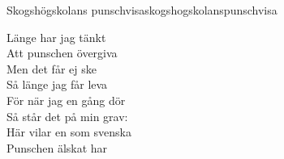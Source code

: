 \begin{song}{Skogshögskolans punschvisa}{skogshogskolanspunschvisa}
\begin{vers}
Länge har jag tänkt\\
Att punschen övergiva\\
Men det får ej ske\\
Så länge jag får leva\\
För när jag en gång dör\\
Så står det på min grav:\\
Här vilar en som svenska\\
Punschen älskat har\\
\end{vers}
\end{song}
